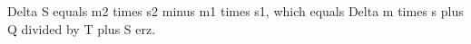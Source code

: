 Delta S equals m2 times s2 minus m1 times s1, which equals Delta m times s plus Q divided by T plus S erz.